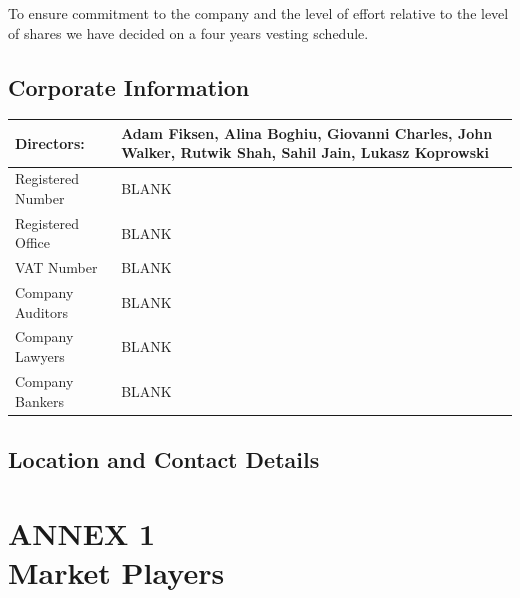 \documentclass[11pt]{article}
\begin{document}
  To ensure commitment to the company and the level of effort relative to the level of shares we have decided on a four years vesting schedule.

  \subsection{Corporate Information}
  \begin{table}[H]
  \begin{center}
  \begin{tabular}{| p{7cm} | p{7cm} |}
  \hline
  Directors:  & Adam Fiksen, \newline Alina Boghiu, \newline Giovanni Charles, \newline John Walker, \newline Rutwik Shah, \newline Sahil Jain, \newline Lukasz Koprowski  \\
  \hline
  Registered Number & BLANK \\
  \hline
  Registered Office & BLANK \\
  \hline
  VAT Number        & BLANK \\
  \hline
  Company Auditors  & BLANK \\
  \hline
  Company Lawyers   & BLANK \\
  \hline
  Company Bankers   & BLANK \\
  \hline
  \end{tabular}
  \end{center}
  \end{table}

  \subsection{Location and Contact Details}

\newpage

\section{ANNEX 1 \\ Market Players}


\newpage
\end{document}
